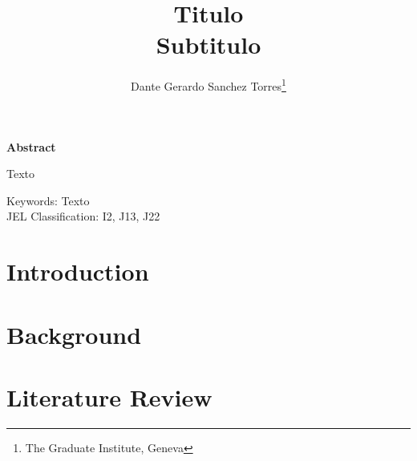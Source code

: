 \documentclass[a4paper,11pt,oneside]{article}
\title{\textbf{Titulo}
\\
Subtitulo}
\author{Dante Gerardo Sanchez Torres\footnote{The Graduate Institute, Geneva}}
\begin{document}
    \maketitle
        \begin{center}
            \Large{\textbf{Abstract}}
        \end{center}
        Texto

        \noindent Keywords: Texto \\
        \noindent JEL Classification: I2, J13, J22


    
    \newpage
    \section*{Introduction\label{Introduction}}
    
    

    \section*{Background\label{Background}}
     
    

    \section*{Literature Review\label{LitReview}}
     
\end{document}
